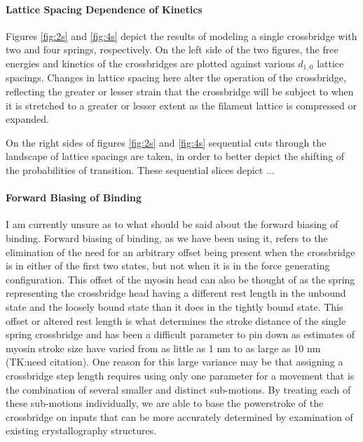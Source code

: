 \documentclass[]{article}
\begin{document}
\paragraph{Lattice Spacing Dependence of Kinetics} %
Figures \ref{fig:2s} and \ref{fig:4s} depict the results of modeling a single crossbridge with two and four springs, respectively.
On the left side of the two figures, the free energies and kinetics of the crossbridges are plotted against various $d_{1,0}$ lattice spacings. 
Changes in lattice spacing here alter the operation of the crossbridge, reflecting the greater or lesser strain that the crossbridge will be subject to when it is stretched to a greater or lesser extent as the filament lattice is compressed or expanded.

On the right sides of figures \ref{fig:2s} and \ref{fig:4s} sequential cuts through the landscape of lattice spacings are taken, in order to better depict the shifting of the probabilities of transition.
These sequential slices depict ...


\paragraph{Forward Biasing of Binding} %
I am currently unsure as to what should be said about the forward biasing of binding.
Forward biasing of binding, as we have been using it, refers to the elimination of the need for an arbitrary offset being present when the crossbridge is in either of the first two states, but not when it is in the force generating configuration.
This offset of the myosin head can also be thought of as the spring representing the crossbridge head having a different rest length in the unbound state and the loosely bound state than it does in the tightly bound state. 
This offset or altered rest length is what determines the stroke distance of the single spring crossbridge and has been a difficult parameter to pin down as estimates of myosin stroke size have varied from as little as 1 nm to as large as 10 nm (TK:need citation). 
One reason for this large variance may be that assigning a crossbridge step length requires using only one parameter for a movement that is the combination of several smaller and distinct sub-motions.
By treating each of these sub-motions individually, we are able to base the powerstroke of the crossbridge on inputs that can be more accurately determined by examination of existing crystallography structures.
\end{document}
